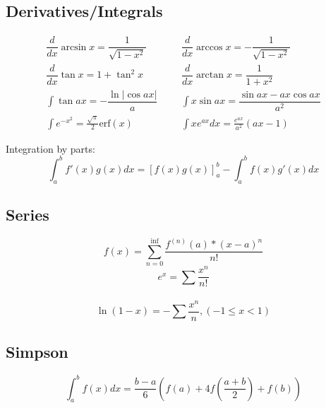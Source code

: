 \subsection{Derivatives/Integrals}
\begin{align*}
	\dfrac{d}{dx}\arcsin x = \dfrac{1}{\sqrt{1-x^2}} &&& \dfrac{d}{dx}\arccos x = -\dfrac{1}{\sqrt{1-x^2}} \\
	\dfrac{d}{dx}\tan x = 1+\tan^2 x &&& \dfrac{d}{dx}\arctan x = \dfrac{1}{1+x^2} \\
	\int\tan ax = -\dfrac{\ln|\cos ax|}{a} &&& \int x\sin ax = \dfrac{\sin ax-ax \cos ax}{a^2} \\
	\int e^{-x^2} = \frac{\sqrt \pi}{2} \text{erf}(x) &&& \int xe^{ax}dx = \frac{e^{ax}}{a^2}(ax-1)
\end{align*}

Integration by parts:
\[\int_a^bf'(x)g(x)dx = [f(x)g(x)]_a^b-\int_a^bf(x)g'(x)dx\]

\subsection{Series}
$$f(x) = \sum_{n = 0}^{\inf} \frac{f^{(n)}(a) * (x - a)^n}{n!}$$
$$e^x = \sum \frac{x^n}{n!}$$\\  
$$\ln(1-x) = -\sum \frac{x^n}{n},(-1\leq x <1)$$

\subsection{Simpson}
$$\int_a^b f(x)dx = \frac{b - a}{6}(f(a) + 4f(\frac{a + b}{2}) + f(b))$$
